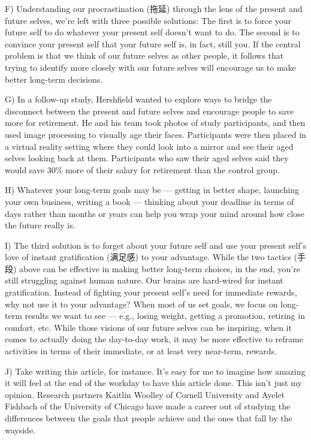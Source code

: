 \documentclass[UTF8,11pt]{ctexart}
\begin{document}
F) Understanding our procrastination (拖延) through the lens of the present and future selves, we’re left with three possible solutions: The first is to force your future self to do whatever your present self doesn’t want to do. The second is to convince your present self that your future self is, in fact, still you. If the central problem is that we think of our future selves as other people, it follows that trying to identify more closely with our future selves will encourage us to make better long-term decisions.


G) In a follow-up study, Hershfield wanted to explore ways to bridge the disconnect between the present and future selves and encourage people to save more for retirement. He and his team took photos of study participants, and then used image processing to visually age their faces. Participants were then placed in a virtual reality setting where they could look into a mirror and see their aged selves looking back at them. Participants who saw their aged selves said they would save 30\% more of their salary for retirement than the control group.


H) Whatever your long-term goals may be — getting in better shape, launching your own business, writing a book — thinking about your deadline in terms of days rather than months or years can help you wrap your mind around how close the future really is.


I) The third solution is to forget about your future self and use your present self’s love of instant gratification (满足感) to your advantage. While the two tactics (手段) above can be effective in making better long-term choices, in the end, you’re still struggling against human nature. Our brains are hard-wired for instant gratification. Instead of fighting your present self’s need for immediate rewards, why not use it to your advantage? When most of us set goals, we focus on long-term results we want to see — e.g., losing weight, getting a promotion, retiring in comfort, etc. While those visions of our future selves can be inspiring, when it comes to actually doing the day-to-day work, it may be more effective to reframe activities in terms of their immediate, or at least very near-term, rewards.


J) Take writing this article, for instance. It’s easy for me to imagine how amazing it will feel at the end of the workday to have this article done. This isn’t just my opinion. Research partners Kaitlin Woolley of Cornell University and Ayelet Fishbach of the University of Chicago have made a career out of studying the differences between the goals that people achieve and the ones that fall by the wayside.
\end{document}
